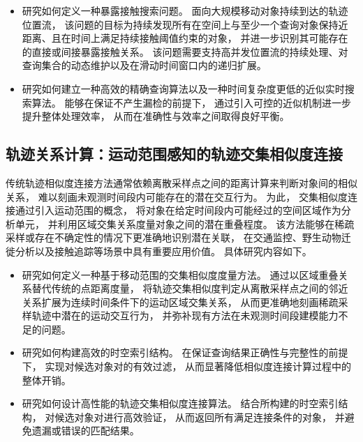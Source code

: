 \begin{itemize}
    \item 研究如何定义一种暴露接触搜索问题。 面向大规模移动对象持续到达的轨迹位置流， 该问题的目标为持续发现所有在空间上与至少一个查询对象保持近距离、且在时间上满足持续接触阈值约束的对象， 并进一步识别其可能存在的直接或间接暴露接触关系。 该问题需要支持高并发位置流的持续处理、对查询集合的动态维护以及在滑动时间窗口内的递归扩展。
    \item 研究如何建立一种高效的精确查询算法以及一种时间复杂度更低的近似实时搜索算法。 能够在保证不产生漏检的前提下， 通过引入可控的近似机制进一步提升整体处理效率， 从而在准确性与效率之间取得良好平衡。
\end{itemize}

\subsection{轨迹关系计算：运动范围感知的轨迹交集相似度连接}

传统轨迹相似度连接方法通常依赖离散采样点之间的距离计算来判断对象间的相似关系， 难以刻画未观测时间段内可能存在的潜在交互行为。 为此， 交集相似度连接通过引入运动范围的概念， 将对象在给定时间段内可能经过的空间区域作为分析单元， 并利用区域交集关系度量对象之间的潜在重叠程度。 该方法能够在稀疏采样或存在不确定性的情况下更准确地识别潜在关联， 在交通监控、野生动物迁徙分析以及接触追踪等场景中具有重要应用价值。 具体研究内容如下。

\begin{itemize}
    \item 研究如何定义一种基于移动范围的交集相似度度量方法。 通过以区域重叠关系替代传统的点距离度量， 将轨迹交集相似度判定从离散采样点之间的邻近关系扩展为连续时间条件下的运动区域交集关系， 从而更准确地刻画稀疏采样轨迹中潜在的运动交互行为， 并弥补现有方法在未观测时间段建模能力不足的问题。

    \item 研究如何构建高效的时空索引结构。 在保证查询结果正确性与完整性的前提下， 实现对候选对象对的有效过滤， 从而显著降低相似度连接计算过程中的整体开销。

    \item 研究如何设计高性能的轨迹交集相似度连接算法。 结合所构建的时空索引结构， 对候选对象对进行高效验证， 从而返回所有满足连接条件的对象， 并避免遗漏或错误的匹配结果。
\end{itemize}


